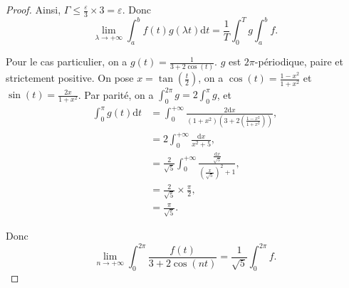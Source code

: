 \documentclass[12pt]{article}
\begin{document}
\begin{proof}
    Ainsi, $\Gamma\leqslant\frac{\varepsilon}{3}\times 3=\varepsilon$. Donc 
    \begin{equation}
        \boxed{
            \lim\limits_{\lambda\to+\infty}\int_{a}^{b}f(t)g(\lambda t)\mathrm{d}t=\frac{1}{T}\int_{0}^{T}g\int_{a}^{b}f.
        }
    \end{equation}

    Pour le cas particulier, on a $g(t)=\frac{1}{3+2\cos(t)}$. $g$ est $2\pi$-périodique, paire et strictement positive. On pose $x=\tan\left(\frac{t}{2}\right)$, on a $\cos(t)=\frac{1-x^{2}}{1+x^{2}}$ et $\sin(t)=\frac{2x}{1+x^{2}}$. Par parité, on a $\int_{0}^{2\pi}g=2\int_{0}^{\pi}g$, et 
    \begin{align}
        \int_{0}^{\pi}g(t)\mathrm{d}t
        &=\int_{0}^{+\infty}\frac{2\mathrm{d}x}{(1+x^{2})\left(3+2\left(\frac{1-x^{2}}{1+x^{2}}\right)\right)},\\
        &= 2\int_{0}^{+\infty}\frac{\mathrm{d}x}{x^{2}+5},\\
        &= \frac{2}{\sqrt{5}}\int_{0}^{+\infty}\frac{\frac{\mathrm{d}x}{\sqrt{5}}}{\left(\frac{x}{\sqrt{5}}\right)^{2}+1},\\
        &= \frac{2}{\sqrt{5}}\times\frac{\pi}{2},\\
        &=\frac{\pi}{\sqrt{5}}.
    \end{align}

    Donc 
    \begin{equation}
        \boxed{
            \lim\limits_{n\to+\infty}\int_{0}^{2\pi}\frac{f(t)}{3+2\cos(nt)}=\frac{1}{\sqrt{5}}\int_{0}^{2\pi}f.
        }
    \end{equation}
\end{proof}
\end{document}

